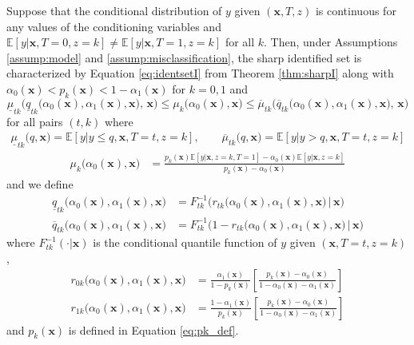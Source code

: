 \begin{thm}
  \label{thm:sharpII}
  Suppose that the conditional distribution of $y$ given $(\mathbf{x}, T,z)$ is continuous for any values of the conditioning variables and $\mathbb{E}\left[ y|\mathbf{x},T=0,z=k \right] \neq \mathbb{E}\left[ y|\mathbf{x},T=1,z=k \right]$ for all $k$.
  Then, under Assumptions \ref{assump:model} and \ref{assump:misclassification}, the sharp identified set is characterized by Equation \ref{eq:identsetI} from Theorem \ref{thm:sharpI} along with $\alpha_0(\mathbf{x}) < p_k(\mathbf{x}) < 1 -  \alpha_1(\mathbf{x})$ for $k = 0,1$ and
\[
  \underline{\mu}_{tk}\bigg( \underline{q}_{tk}\big( \alpha_0(\mathbf{x}), \alpha_1(\mathbf{x}), \mathbf{x}\big) , \,\mathbf{x} \bigg)\leq 
  \mu_{k}\big( \alpha_0(\mathbf{x}),\mathbf{x} \big)\leq 
  \overline{\mu}_{tk}\bigg(\overline{q}_{tk}\big( \alpha_0(\mathbf{x}), \alpha_1(\mathbf{x}), \mathbf{x}\big), \,\mathbf{x} \bigg)
\]
for all pairs $(t,k)$ where
\begin{align*}
  \underline{\mu}_{tk}\big( q,\mathbf{x} \big) = \mathbb{E}\left[ y\left|\right.y\leq q, \mathbf{x},T=t, z=k\right], \quad \quad
  \overline{\mu}_{tk}\big(q,\mathbf{x} \big) = \mathbb{E}\left[ y\left|\right. y > q, \mathbf{x}, T=t, z=k\right]
\end{align*}
  \begin{align*}
  \mu_k\big(\alpha_0(\mathbf{x}),\mathbf{x}\big) &= 
  \frac{p_k(\mathbf{x}) \mathbb{E}[y|\mathbf{x},z=k,T=1] - \alpha_0(\mathbf{x}) \mathbb{E}[y|\mathbf{x},z=k]}{p_k(\mathbf{x}) - \alpha_0(\mathbf{x})}
\end{align*}
and we define 
\begin{align*}
  \underline{q}_{tk}\big(\alpha_0(\mathbf{x}),\alpha_1(\mathbf{x}),\mathbf{x}\big) &= F^{-1}_{tk}\bigg(r_{tk}\big(\alpha_0(\mathbf{x}),\alpha_1(\mathbf{x}), \mathbf{x}\big)\, \bigg|\,\mathbf{x}\bigg)\\
  \overline{q}_{tk}\big(\alpha_0(\mathbf{x}),\alpha_1(\mathbf{x}),\mathbf{x}\big) &= F^{-1}_{tk}\bigg(1 - r_{tk}\big(\alpha_0(\mathbf{x}), \alpha_1(\mathbf{x}),\mathbf{x}\big) \,\bigg|\,\mathbf{x}\bigg)
\end{align*}
where $F_{tk}^{-1}(\cdot|\mathbf{x})$ is the conditional quantile function of $y$ given $(\mathbf{x},T=t,z=k)$,  
\begin{align*}
  r_{0k}\big(\alpha_0(\mathbf{x}),\alpha_1(\mathbf{x}),\mathbf{x}\big) &= \frac{\alpha_1(\mathbf{x})}{1 - p_k(\mathbf{x})} \left[ \frac{p_k(\mathbf{x}) - \alpha_0(\mathbf{x})}{1 - \alpha_0(\mathbf{x}) - \alpha_1(\mathbf{x})} \right]\\
  r_{1k}\big(\alpha_0(\mathbf{x}),\alpha_1(\mathbf{x}),\mathbf{x}\big) &= \frac{1 - \alpha_1(\mathbf{x})}{p_k(\mathbf{x})} \left[ \frac{p_k(\mathbf{x}) - \alpha_0(\mathbf{x})}{1 - \alpha_0(\mathbf{x}) - \alpha_1(\mathbf{x})} \right]
\end{align*}
and $p_k(\mathbf{x})$ is defined in Equation \ref{eq:pk_def}.
\end{thm}

